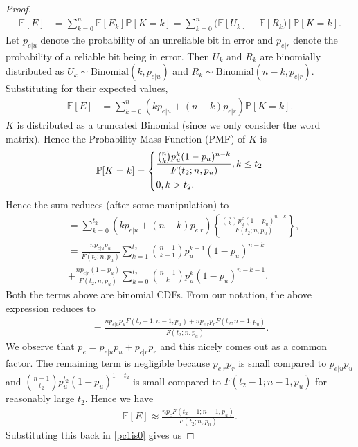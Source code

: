 \documentclass[conference]{IEEEtran}
\begin{document}
\begin{proof}
\begin{align*}
    \mathbb{E}[E] &= \sum_{k=0}^n \mathbb{E}[E_k] \mathbb{P}[K = k] 
    = \sum_{k=0}^n (\mathbb{E}[U_k]+\mathbb{E}[R_k)] \mathbb{P}[K = k].
\end{align*}
Let $p_{e|u}$ denote the probability of an unreliable bit in error and $p_{e|r}$ denote the probability of a reliable bit being in error. Then $U_k$ and $R_k$ are binomially distributed as $U_k \sim \text{Binomial}(k, p_{e|u})$ and $R_k \sim \text{Binomial}(n-k, p_{e|r})$. Substituting for their expected values,
\begin{align*}
    \mathbb{E}[E] &= \sum_{k=0}^n (kp_{e|u} + (n-k)p_{e|r})\mathbb{P}[K = k].
\end{align*}
$K$ is distributed as a truncated Binomial (since we only consider the word matrix). Hence the Probability Mass Function (PMF) of $K$ is
\begin{align*} \mathbb{P}[K = k] = \begin{dcases}
\dfrac{\binom{n}{k}p_u^k(1-p_u)^{n-k}}{F(t_2; n, p_u)} , k \leq t_2\\
0, k > t_2.
\end{dcases}
\end{align*}
Hence the sum reduces (after some manipulation) to
\begin{align*}
    &=\sum_{k=0}^{t_2} (kp_{e|u} + (n-k)p_{e|r}) \left\{ \frac{\binom{n}{k}p_u^k(1-p_u)^{n-k}}{F(t_2; n, p_u)} \right\},\\
    &=\frac{np_{e|u}p_u}{F(t_2; n, p_u)}\sum_{k=1}^{t_2} \binom{n-1}{k-1}p_u^{k-1}(1-p_u)^{n-k} \\
    &+
    \frac{np_{e|r}(1-p_u)}{F(t_2; n, p_u)}\sum_{k=0}^{t_2} \binom{n-1}{k}p_u^k(1-p_u)^{n-k-1}.
\end{align*}
Both the terms above are binomial CDFs. From our notation, the above expression reduces to
\begin{align*}
    =\frac{np_{e|u}p_u F(t_2-1; n-1, p_u) + np_{e|r}p_r F(t_2; n-1, p_u)}{F(t_2; n, p_u)}.
\end{align*}
We observe that $p_e = p_{e|u}p_u+p_{e|r}p_r$ and this nicely comes out as a common factor. The remaining term is negligible because $p_{e|r}p_r$ is small compared to $p_{e|u}p_u$ and $\binom{n-1}{t_2} p_u^{t_2} (1-p_u)^{1-t_2}$ is small compared to $F(t_2-1; n-1, p_u)$ for reasonably large $t_2$. Hence we have
\begin{align*}
    \mathbb{E}[E] \approx \frac{np_e F(t_2-1; n-1, p_u)}{F(t_2; n, p_u)}.
\end{align*}
Substituting this back in \eqref{pc1is0} gives us

\end{proof}
\end{document}
